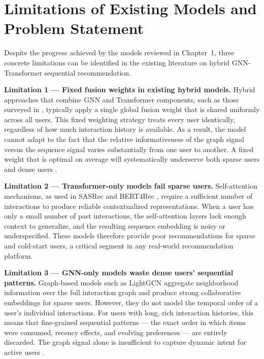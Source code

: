 \documentclass[12pt,a4paper]{report}
\begin{document}
\section{Limitations of Existing Models and Problem Statement}
\label{sec:limitations}

Despite the progress achieved by the models reviewed in Chapter~1, three
concrete limitations can be identified in the existing literature on hybrid
GNN-Transformer sequential recommendation.

\textbf{Limitation 1 — Fixed fusion weights in existing hybrid models.}
Hybrid approaches that combine GNN and Transformer components, such as those
surveyed in \citep{wu2020gnnsurvey}, typically apply a single global fusion
weight that is shared uniformly across all users. This fixed weighting strategy
treats every user identically, regardless of how much interaction history is
available. As a result, the model cannot adapt to the fact that the relative
informativeness of the graph signal versus the sequence signal varies
substantially from one user to another. A fixed weight that is optimal on
average will systematically underserve both sparse users and dense users
\citep{pan2024survey}.

\textbf{Limitation 2 — Transformer-only models fail sparse users.}
Self-attention mechanisms, as used in SASRec \citep{kang2018sasrec} and
BERT4Rec \citep{sun2019bert4rec}, require a sufficient number of interactions
to produce reliable contextualized representations. When a user has only a
small number of past interactions, the self-attention layers lack enough context
to generalize, and the resulting sequence embedding is noisy or
underspecified. These models therefore provide poor recommendations for sparse
and cold-start users, a critical segment in any real-world recommendation
platform.

\textbf{Limitation 3 — GNN-only models waste dense users' sequential patterns.}
Graph-based models such as LightGCN \citep{he2020lightgcn} aggregate
neighborhood information over the full interaction graph and produce strong
collaborative embeddings for sparse users. However, they do not model the
temporal order of a user's individual interactions. For users with long, rich
interaction histories, this means that fine-grained sequential patterns ---
the exact order in which items were consumed, recency effects, and evolving
preferences --- are entirely discarded. The graph signal alone is insufficient
to capture dynamic intent for active users \citep{pan2024survey}.
\end{document}
